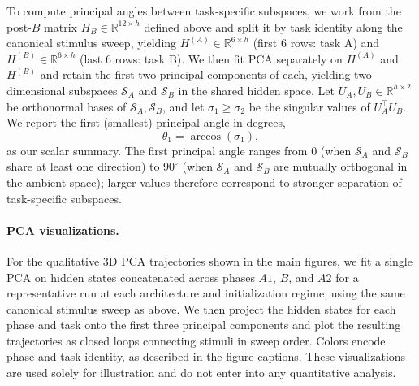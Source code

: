 To compute principal angles between task-specific subspaces, we work from the post-$B$ matrix $H_B \in \mathbb{R}^{12 \times h}$ defined above and split it by task identity along the canonical stimulus sweep, yielding $H^{(A)} \in \mathbb{R}^{6 \times h}$ (first 6 rows: task A) and $H^{(B)} \in \mathbb{R}^{6 \times h}$ (last 6 rows: task B). We then fit PCA separately on $H^{(A)}$ and $H^{(B)}$ and retain the first two principal components of each, yielding two-dimensional subspaces $\mathcal{S}_A$ and $\mathcal{S}_B$ in the shared hidden space. Let $U_A, U_B \in \mathbb{R}^{h \times 2}$ be orthonormal bases of $\mathcal{S}_A, \mathcal{S}_B$, and let $\sigma_1 \geq \sigma_2$ be the singular values of $U_A^\top U_B$. We report the first (smallest) principal angle in degrees,
\[
\theta_1 = \arccos(\sigma_1),
\]
as our scalar summary. The first principal angle ranges from $0$ (when $\mathcal{S}_A$ and $\mathcal{S}_B$ share at least one direction) to $90^\circ$ (when $\mathcal{S}_A$ and $\mathcal{S}_B$ are mutually orthogonal in the ambient space); larger values therefore correspond to stronger separation of task-specific subspaces.

\paragraph{PCA visualizations.}
For the qualitative 3D PCA trajectories shown in the main figures, we fit a single PCA on hidden states concatenated across phases $A1$, $B$, and $A2$ for a representative run at each architecture and initialization regime, using the same canonical stimulus sweep as above. We then project the hidden states for each phase and task onto the first three principal components and plot the resulting trajectories as closed loops connecting stimuli in sweep order. Colors encode phase and task identity, as described in the figure captions. These visualizations are used solely for illustration and do not enter into any quantitative analysis.